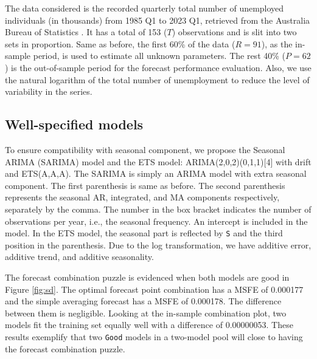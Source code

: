 \documentclass{monashthesis}
\begin{document}
The data considered is the recorded quarterly total number of unemployed individuals (in thousands) from 1985 Q1 to 2023 Q1, retrieved from the Australia Bureau of Statistics \autocite{ABS}. It has a total of 153 (\(T\)) observations and is slit into two sets in proportion. Same as before, the first 60\% of the data (\(R = 91\)), as the in-sample period, is used to estimate all unknown parameters. The rest 40\% (\(P = 62\)) is the out-of-sample period for the forecast performance evaluation. Also, we use the natural logarithm of the total number of unemployment to reduce the level of variability in the series.

\hypertarget{well-specified-models}{%
\subsection{Well-specified models}\label{well-specified-models}}

To ensure compatibility with seasonal component, we propose the Seasonal ARIMA (SARIMA) model and the ETS model: ARIMA(2,0,2)(0,1,1){[}4{]} with drift and ETS(A,A,A). The SARIMA is simply an ARIMA model with extra seasonal component. The first parenthesis is same as before. The second parenthesis represents the seasonal AR, integrated, and MA components respectively, separately by the comma. The number in the box bracket indicates the number of observations per year, i.e., the seasonal frequency. An intercept is included in the model. In the ETS model, the seasonal part is reflected by \texttt{S} and the third position in the parenthesis. Due to the log transformation, we have additive error, additive trend, and additive seasonality.

The forecast combination puzzle is evidenced when both models are good in Figure \ref{fig:sd}. The optimal forecast point combination has a MSFE of 0.000177 and the simple averaging forecast has a MSFE of 0.000178. The difference between them is negligible. Looking at the in-sample combination plot, two models fit the training set equally well with a difference of 0.00000053. These results exemplify that two \texttt{Good} models in a two-model pool will close to having the forecast combination puzzle.
\end{document}
